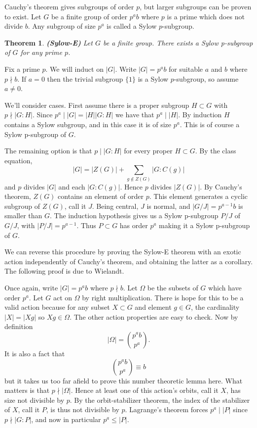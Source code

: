 \documentclass[letterpaper]{article}
\newtheorem{theorem}{Theorem}[section]
\newenvironment{proof}[1][Proof]{\begin{trivlist}
\item[\hskip \labelsep {\bfseries #1}]}{\end{trivlist}}
\begin{document}
Cauchy's theorem gives subgroups of order $p$, but larger subgroups can be proven to exist. Let $G$ be a finite group of order $p^ab$ where $p$ is a prime which does not divide $b$. Any subgroup of size $p^a$ is called a Sylow $p$-subgroup.

\begin{theorem}
\emph{\textbf{(Sylow-E)}}
Let $G$ be a finite group. There exists a Sylow p-subgroup of $G$ for any prime $p$.
\end{theorem}
\begin{proof}
Fix a prime $p$. We will induct on $|G|$. Write $|G| = p^ab$ for suitable $a$ and $b$ where $p \nmid b$. If $a = 0$ then the trivial subgroup $\{1\}$ is a Sylow $p$-subgroup, so assume $a \neq 0$.

We'll consider cases. First assume there is a proper subgroup $H \subset G$ with $p \nmid |G : H|$. Since $p^a \mid |G| = |H||G : H|$ we have that $p^a \mid |H|$. By induction $H$ contains a Sylow subgroup, and in this case it is of size $p^a$. This is of course a Sylow p-subgroup of $G$.

The remaining option is that $p \mid |G : H|$ for every proper $H \subset G$. By the class equation,
\[|G| = |Z(G)| + \sum_{g \not \in Z(G)} |G \colon C(g)|\]
and $p$ divides $|G|$ and each $|G \colon C(g)|$. Hence $p$ divides $|Z(G)|$. By Cauchy's theorem, $Z(G)$ contains an element of order $p$. This element generates a cyclic subgroup of $Z(G)$, call it $J$. Being central, $J$ is normal, and $|G/J| = p^{a-1}b$ is smaller than $G$. The induction hypothesis gives us a Sylow p-subgroup $P/J$ of $G/J$, with $|P/J| = p^{a-1}$. Thus $P \subset G$ has order $p^a$ making it a Sylow p-subgroup of $G$.
\end{proof}

We can reverse this procedure by proving the Sylow-E theorem with an exotic action independently of Cauchy's theorem, and obtaining the latter as a corollary. The following proof is due to Wielandt.

Once again, write $|G| = p^ab$ where $p \nmid b$. Let $\Omega$ be the subsets of $G$ which have order $p^a$. Let $G$ act on $\Omega$ by right multiplication. There is hope for this to be a valid action because for any subset $X \subset G$ and element $g \in G$, the cardinality $|X| = |Xg|$ so $Xg \in \Omega$. The other action properties are easy to check. Now by definition \[|\Omega| = {p^ab \choose p^a}.\] It is also a fact that \[{p^ab \choose p^a} \equiv b\] but it takes us too far afield to prove this number theoretic lemma here. What matters is that $p \nmid |\Omega|$. Hence at least one of this action's orbits, call it $X$, has size not divisible by $p$. By the orbit-stabilizer theorem, the index of the stabilizer of $X$, call it $P$, is thus not divisible by $p$. Lagrange's theorem forces $p^a \mid |P|$ since $p \nmid |G \colon P|$, and now in particular $p^a \leq |P|$.
\end{document}
